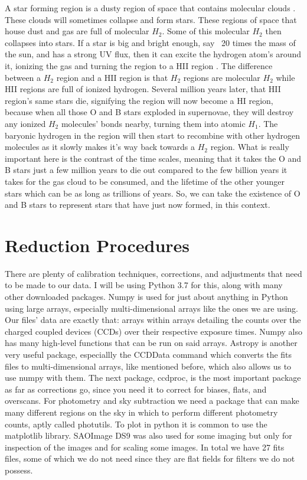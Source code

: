 \documentclass[modern]{aastex63}
\begin{document}
A star forming region is a dusty region of space that contains molecular clouds \citep{1991IAUS..146..373D}. These clouds will sometimes collapse and form stars. These regions of space that house dust and gas are full of molecular $H_{2}$. Some of this molecular $H_{2}$ then collapses into stars. If a star is big and bright enough, say ~20 times the mass of the sun, and has a strong UV flux, then it can excite the hydrogen atom's around it, ionizing the gas and turning the region to a HII region \citep{2009ApJS..181..255A}. The difference between a $H_{2}$ region and a HII region is that $H_{2}$ regions are molecular $H_{2}$ while HII regions are full of ionized hydrogen. Several million years later, that HII region's same stars die, signifying the region will now become a HI region, because when all those O and B stars exploded in supernovae, they will destroy any ionized $H_{2}$ molecules' bonds nearby, turning them into atomic $H_{1}$. The baryonic hydrogen in the region will then start to recombine with other hydrogen molecules as it slowly makes it's way back towards a $H_{2}$ region. What is really important here is the contrast of the time scales, meaning that it takes the O and B stars just a few million years to die out compared to the few billion years it takes for the gas cloud to be consumed, and the lifetime of the other younger stars which can be as long as trillions of years. So, we can take the existence of O and B stars to represent stars that have just now formed, in this context.

\bigskip
\section{Reduction Procedures}

There are plenty of calibration techniques, corrections, and adjustments that need to be made to our data. I will be using Python 3.7 for this, along with many other downloaded packages. Numpy is used for just about anything in Python using large arrays, especially multi-dimensional arrays like the ones we are using. Our files' data are exactly that: arrays within arrays detailing the counts over the charged coupled devices (CCDs) over their respective exposure times. Numpy also has many high-level functions that can be run on said arrays. Astropy is another very useful package, especiallly the CCDData command which converts the fits files to multi-dimensional arrays, like mentioned before, which also allows us to use numpy with them. The next package, ccdproc, is the most important package as far as corrections go, since you need it to correct for biases, flats, and overscans. For photometry and sky subtraction we need a package that can make many different regions on the sky in which to perform different photometry counts, aptly called photutils. To plot in python it is common to use the matplotlib library. SAOImage DS9 was also used for some imaging but only for inspection of the images and for scaling some images. In total we have 27 fits files, some of which we do not need since they are flat fields for filters we do not possess.
\end{document}

